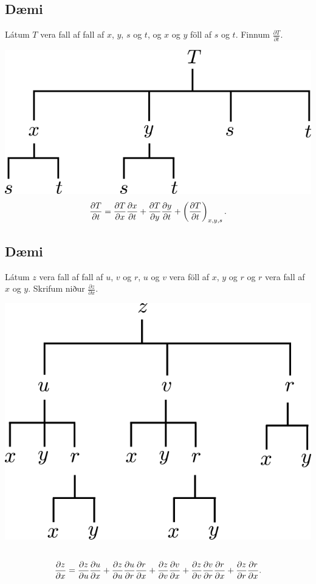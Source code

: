 \documentclass[a4paper,10pt,icelandic]{sphinxmanual}
\begin{document}
\subsection{Dæmi}
\label{Kafli2:id24}
Látum \(T\) vera fall af fall af \(x\), \(y\), \(s\) og
\(t\), og \(x\) og \(y\) föll af \(s\) og \(t\).
Finnum \(\frac{ \partial T}{\partial t}\).

{\hfill\includegraphics[width=0.500\linewidth]{chain6.png}\hfill}
\begin{gather}
\begin{split}\displaystyle \frac{\partial T}{\partial t} = \frac{\partial T}{\partial x} \frac{\partial x}{\partial t} +\frac{\partial T}{\partial y} \frac{\partial y}{\partial t} + \left(\frac{\partial T}{\partial t}\right)_{x,y,s} .\end{split}\notag
\end{gather}

\subsection{Dæmi}
\label{Kafli2:id25}
Látum \(z\) vera fall af fall af \(u\), \(v\) og \(r\),
\(u\) og \(v\) vera föll af \(x\), \(y\) og \(r\) og
\(r\) vera fall af \(x\) og \(y\). Skrifum niður
\(\frac{\partial z}{\partial x}\).

{\hfill\includegraphics[width=0.400\linewidth]{chain4.png}\hfill}
\begin{gather}
\begin{split}\displaystyle\end{split}\notag\\\begin{split}\displaystyle\frac{\partial z}{\partial x} = \frac{\partial z}{\partial u} \frac{\partial u}{\partial x} +\frac{\partial z}{\partial u} \frac{\partial u}{\partial r} \frac{\partial r}{\partial x}
+ \frac{\partial z}{\partial v} \frac{\partial v}{\partial x} + \frac{\partial z}{\partial v} \frac{\partial v}{\partial r} \frac{\partial r}{\partial x} +\frac{\partial z}{\partial r} \frac{\partial r}{\partial x}.\end{split}\notag
\end{gather}
\end{document}
